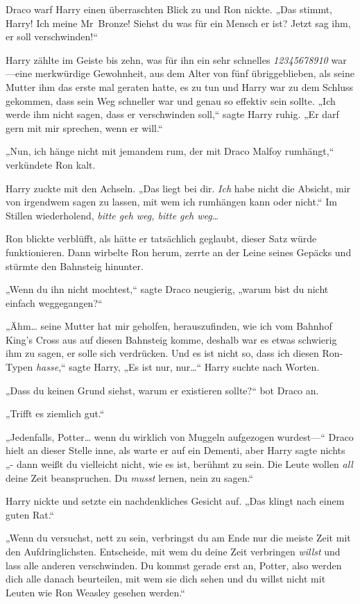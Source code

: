 {Draco warf Harry einen überraschten Blick zu und Ron nickte. „Das stimmt, Harry! Ich meine Mr~Bronze! Siehst du was für ein Mensch er ist? Jetzt sag ihm, er soll verschwinden!“

Harry zählte im Geiste bis zehn, was für ihn ein sehr schnelles \emph{12345678910} war—eine merkwürdige Gewohnheit, aus dem Alter von fünf übriggeblieben, als seine Mutter ihm das erste mal geraten hatte, es zu tun und Harry war zu dem Schluss gekommen, dass sein Weg schneller war und genau so effektiv sein sollte. „Ich werde ihm nicht sagen, dass er verschwinden soll,“ sagte Harry ruhig. „Er darf gern mit mir sprechen, wenn er will.“

„Nun, ich hänge nicht mit jemandem rum, der mit Draco Malfoy rumhängt,“ verkündete Ron kalt.

Harry zuckte mit den Achseln. „Das liegt bei dir. \emph{Ich} habe nicht die Absicht, mir von irgendwem sagen zu lassen, mit wem ich rumhängen kann oder nicht.“ Im Stillen wiederholend, \emph{bitte geh weg, bitte geh weg…}

Ron blickte verblüfft, als hätte er tatsächlich geglaubt, dieser Satz würde funktionieren. Dann wirbelte Ron herum, zerrte an der Leine seines Gepäcks und stürmte den Bahnsteig hinunter.

„Wenn du ihn nicht mochtest,“ sagte Draco neugierig, „warum bist du nicht einfach weggegangen?“

„Ähm… seine Mutter hat mir geholfen, herauszufinden, wie ich vom Bahnhof King's Cross aus auf diesen Bahnsteig komme, deshalb war es etwas schwierig ihm zu sagen, er solle sich verdrücken. Und es ist nicht so, dass ich diesen Ron-Typen \emph{hasse},“ sagte Harry, „Es ist nur, nur…“ Harry suchte nach Worten.

„Dass du keinen Grund siehst, warum er existieren sollte?“ bot Draco an.

„Trifft es ziemlich gut.“

„Jedenfalls, Potter… wenn du wirklich von Muggeln aufgezogen wurdest—“ Draco hielt an dieser Stelle inne, als warte er auf ein Dementi, aber Harry sagte nichts „- dann weißt du vielleicht nicht, wie es ist, berühmt zu sein. Die Leute wollen \emph{all} deine Zeit beanspruchen. Du \emph{musst} lernen, nein zu sagen.“

Harry nickte und setzte ein nachdenkliches Gesicht auf. „Das klingt nach einem guten Rat.“

„Wenn du versuchst, nett zu sein, verbringst du am Ende nur die meiste Zeit mit den Aufdringlichsten. Entscheide, mit wem du deine Zeit verbringen \emph{willst} und lass alle anderen verschwinden. Du kommst gerade erst an, Potter, also werden dich alle danach beurteilen, mit wem sie dich sehen und du willst nicht mit Leuten wie Ron Weasley gesehen werden.“

}
